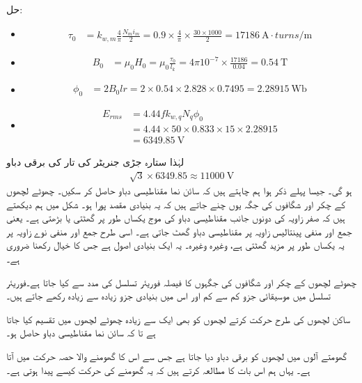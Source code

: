 حل:
\begin{itemize}
\item
\begin{align*}
\tau_0&=k_{w,m} \frac{4}{\pi}\frac{N_m i_m}{2}=0.9 \times \frac{4}{\pi} \times \frac{30 \times 1000}{2}=\SI{17186}{\ampere \cdot turns \per \meter}
\end{align*}
\item
\begin{align*}
B_0&=\mu_0 H_0=\mu_0 \frac{\tau_0}{l_k}=4 \pi 10^{-7} \times \frac{17186}{0.04}=\SI{0.54}{\tesla}
\end{align*}
\item
\begin{align*}
\phi_0&=2 B_0 l r =2 \times 0.54 \times 2.828 \times 0.7495=\SI{2.28915}{\weber}
\end{align*}
\item
\begin{align*}
E_{rms}&=4.44 f k_{w,q} N_q \phi_0\\
&=4.44 \times 50 \times 0.833 \times 15 \times 2.28915\\
&=\SI{6349.85}{\volt} 
\end{align*}
\end{itemize}
لہٰذا ستارہ جڑی جنریٹر کی تار کی برقی دباو
\begin{align*}
\sqrt{3} \times 6349.85 \approx \SI{11000}{\volt}
\end{align*}
ہو گی۔
%
جیسا پہلے ذکر ہوا ہم چاہتے ہیں کہ سائن نما مقناطیسی دباو حاصل کر سکیں۔ چھوٹے لچھوں کے چکر اور شگافوں کی جگہ یوں چنے جاتے ہیں کہ یہ بنیادی مقصد پورا ہو۔ شکل   میں ہم دیکھتے ہیں کہ صفر زاویہ کی دونوں جانب مقناطیسی دباو کی موج یکساں طور پر گھٹتی یا بڑھتی ہے۔ یعنی جمع اور منفی  پینتالیس زاویہ پر مقناطیسی دباو    گھٹ جاتی ہے۔ اسی طرح جمع اور منفی نوے زاویہ پر یہ یکساں طور پر مزید گھٹتی ہے، وغیرہ وغیرہ۔ یہ ایک بنیادی اصول ہے جس کا خیال رکھنا ضروری ہے۔

چھوٹے لچھوں کے چکر اور شگافوں کی جگہوں کا فیصلہ فوریئر تسلسل کی مدد سے کیا جاتا ہے۔فوریئر تسلسل میں موسیقائی جزو کم سے کم اور اس میں بنیادی جزو زیادہ سے زیادہ رکھے جاتے ہیں۔

ساکن لچھوں کی طرح حرکت کرتے لچھوں کو بھی ایک سے زیادہ چھوٹے لچھوں میں تقسیم کیا جاتا ہے تا کہ سائن نما مقناطیسی دباو حاصل ہو۔

گھومتے آلوں میں لچھوں کو برقی دباو دیا جاتا ہے جس سے اس کا گھومنے والا حصہ حرکت میں آتا ہے۔ یہاں ہم اس بات کا مطالعہ کرتے ہیں کہ یہ گھومنے کی حرکت کیسے پیدا ہوتی ہے۔

